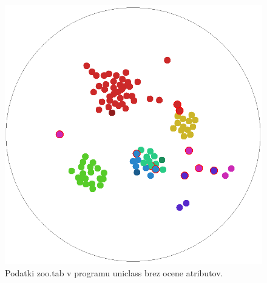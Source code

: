 \documentclass[a4paper]{article}
\begin{document}
	\begin{figure}[H]
	\begin{center}
	\includegraphics[width=1\textwidth]{img/clus_uni_pic.png}
	\end{center}
	\caption{Podatki zoo.tab v programu uniclass brez ocene atributov.}
	\label{clus-uni-img}
	\end{figure}
\end{document}
